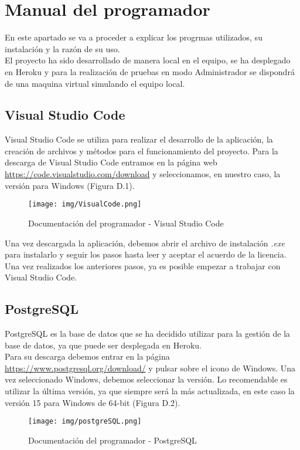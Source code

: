 \section{Manual del programador}
En este apartado se va a proceder a explicar los progrmas utilizados, su instalación y la razón de su uso.\\
El proyecto ha sido desarrollado de manera local en el equipo, se ha desplegado en Heroku y para la realización de pruebas en modo Administrador se dispondrá de una maquina virtual simulando el equipo local.\\
\subsection{Visual Studio Code}
Visual Studio Code se utiliza para realizar el desarrollo de la aplicación, la creación de archivos y métodos para el funcionamiento del proyecto.
Para la descarga de Visual Studio Code entramos en la página web \url{https://code.visualstudio.com/download} y seleccionamos, en nuestro caso, la versión para Windows (Figura D.1).\\
\begin{figure}[h!]
    \centering
    \texttt{[image: img/VisualCode.png]} \\
    \caption{Documentación del programador - Visual Studio Code}
    \label{Documentación del programador - Visual Studio Code}
\end{figure}
Una vez descargada la aplicación, debemos abrir el archivo de instalación \textit{.exe} para instalarlo y seguir los pasos hasta leer y aceptar el acuerdo de la licencia.
Una vez realizados los anteriores pasos, ya es posible empezar a trabajar con Visual Studio Code.
\subsection{PostgreSQL}
PostgreSQL es la base de datos que se ha decidido utilizar para la gestión de la base de datos, ya que puede ser desplegada en Heroku.\\
Para su descarga debemos entrar en la página \url{https://www.postgresql.org/download/} y pulsar sobre el icono de Windows. Una vez seleccionado Windows, debemos seleccionar la versión. Lo recomendable es utilizar la última versión, ya que siempre será la más actualizada, en este caso la versión 15 para Windows de 64-bit (Figura D.2). 
\begin{figure}[h!]
    \centering
    \texttt{[image: img/postgreSQL.png]}\\
    \caption{Documentación del programador - PostgreSQL}
    \label{Documentación del programador - PostgreSQL}
\end{figure}

